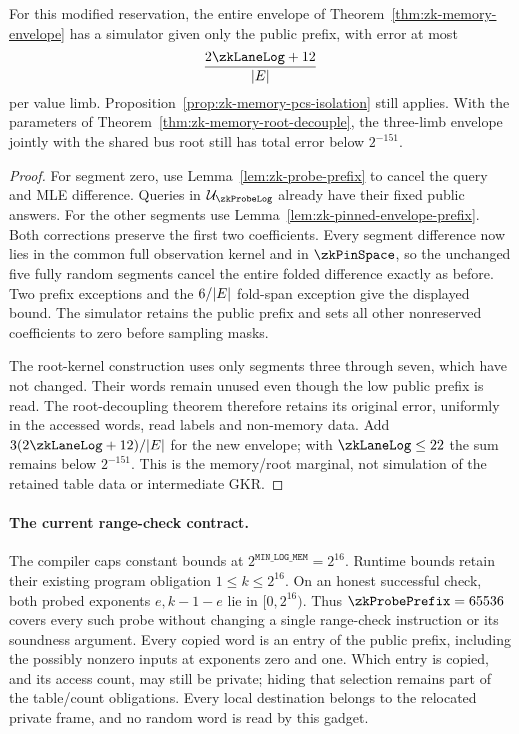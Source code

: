\begin{theorem}\label{thm:zk-public-probe-envelope}
For this modified reservation, the entire envelope of Theorem~\ref{thm:zk-memory-envelope} has a simulator given only the public prefix, with error at most
\[
 \frac{2\zkLaneLog+12}{|\E|}
\]
per value limb. Proposition~\ref{prop:zk-memory-pcs-isolation} still applies. With the parameters of Theorem~\ref{thm:zk-memory-root-decouple}, the three-limb envelope jointly with the shared bus root still has total error below $2^{-151}$.
\end{theorem}
\begin{proof}
For segment zero, use Lemma~\ref{lem:zk-probe-prefix} to cancel the query and MLE difference. Queries in $\subsp_{\zkProbeLog}$ already have their fixed public answers. For the other segments use Lemma~\ref{lem:zk-pinned-envelope-prefix}. Both corrections preserve the first two coefficients. Every segment difference now lies in the common full observation kernel and in $\zkPinSpace$, so the unchanged five fully random segments cancel the entire folded difference exactly as before. Two prefix exceptions and the $6/|E|$ fold-span exception give the displayed bound. The simulator retains the public prefix and sets all other nonreserved coefficients to zero before sampling masks.

The root-kernel construction uses only segments three through seven, which have not changed. Their words remain unused even though the low public prefix is read. The root-decoupling theorem therefore retains its original error, uniformly in the accessed words, read labels and non-memory data. Add $3(2\zkLaneLog+12)/|\E|$ for the new envelope; with $\zkLaneLog\le22$ the sum remains below $2^{-151}$. This is the memory/root marginal, not simulation of the retained table data or intermediate GKR.
\end{proof}

\paragraph{The current range-check contract.} The compiler caps constant bounds at $2^{\texttt{MIN\_LOG\_MEM}}=2^{16}$. Runtime bounds retain their existing program obligation $1\le k\le2^{16}$. On an honest successful check, both probed exponents $e,k-1-e$ lie in $[0,2^{16})$. Thus $\zkProbePrefix=65536$ covers every such probe without changing a single range-check instruction or its soundness argument. Every copied word is an entry of the public prefix, including the possibly nonzero inputs at exponents zero and one. Which entry is copied, and its access count, may still be private; hiding that selection remains part of the table/count obligations. Every local destination belongs to the relocated private frame, and no random word is read by this gadget.

